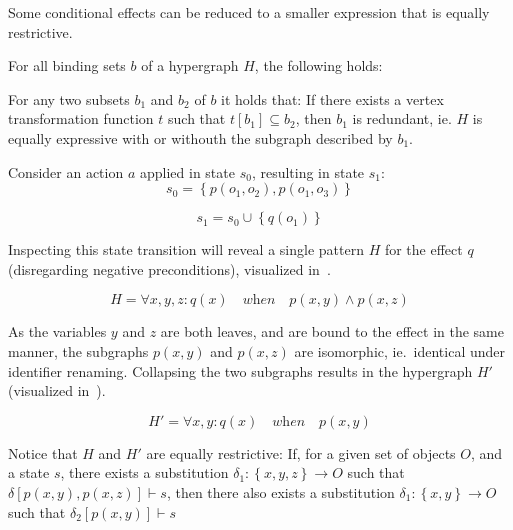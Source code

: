 \documentclass[../Master.tex]{subfiles}
\begin{document}
Some conditional effects can be reduced to a smaller expression that is equally restrictive.

For all binding sets $b$ of a hypergraph $H$, the following holds:

For any two subsets $b_1$ and $b_2$ of $b$ it holds that: If there exists a vertex transformation function $t$ such that $t\left[b_1\right] \subseteq b_2$, then $b_1$ is redundant, ie. $H$ is equally expressive with or withouth the subgraph described by $b_1$.

\begin{example}\label{ex:ca:hgma:ex:collapsing}

	Consider an action $a$ applied in state $s_0$, resulting in state $s_1$:
	\begin{equation*}
		s_0 = \left\{ 
			p\left(o_1, o_2\right), p\left(o_1, o_3\right)
		\right\}
	\end{equation*}

	\begin{equation*}
		s_1 = s_0 \cup \left\{
			q\left( o_1 \right)
		\right\}
	\end{equation*}

	Inspecting this state transition will reveal a single pattern $H$ for the effect $q$ (disregarding negative preconditions), visualized in~.

    \begin{equation*}
        H = \forall x, y, z : q(x) \quad \textit{when} \quad
            p(x,y) \land p(x,z)
    \end{equation*}

	As the variables $y$ and $z$ are both leaves, and are bound to the effect in the same manner, the subgraphs $p(x,y)$ and $p(x,z)$ are isomorphic, ie.\ identical under identifier renaming. Collapsing the two subgraphs results in the hypergraph $H'$ (visualized in~).
	
    \begin{equation*}
        H' = \forall x, y : q(x) \quad \textit{when} \quad p(x,y)
    \end{equation*}

	Notice that $H$ and $H'$ are equally restrictive: If, for a given set of objects $O$, and a state $s$, there exists a substitution $\delta_1 : \left\{x, y, z\right\} \rightarrow O$ such that $\delta\left[p(x,y), p(x,z)\right] \vdash s$, then there also exists a substitution $\delta_1 : \left\{x, y\right\} \rightarrow O$ such that $\delta_2\left[p(x,y)\right] \vdash s$


\end{example}
\end{document}
